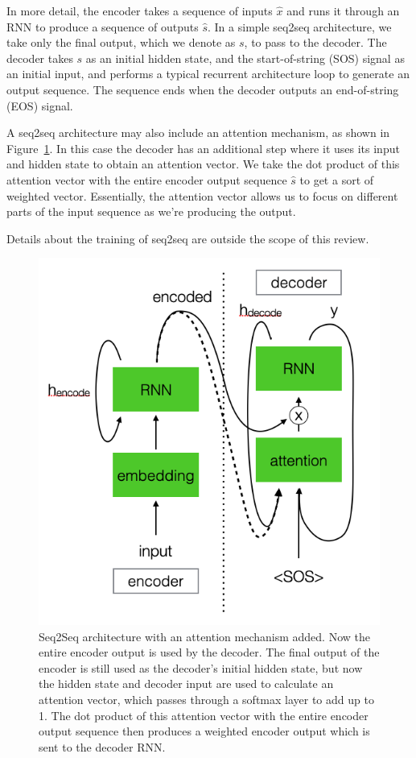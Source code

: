 In more detail, the encoder takes a sequence of inputs $\hat{x}$ and runs it through an RNN to produce a sequence of outputs $\hat{s}$. In a simple seq2seq architecture, we take only the final output, which we denote as $s$, to pass to the decoder. The decoder takes $s$ as an initial hidden state, and the start-of-string (SOS) signal as an initial input, and performs a typical recurrent architecture loop to generate an output sequence. The sequence ends when the decoder outputs an end-of-string (EOS) signal.

A seq2seq architecture may also include an attention mechanism, as shown in Figure~\ref{fig:seq2seq_with_attention}. In this case the decoder has an additional step where it uses its input and hidden state to obtain an attention vector. We take the dot product of this attention vector with the entire encoder output sequence $\hat{s}$ to get a sort of weighted vector. Essentially, the attention vector allows us to focus on different parts of the input sequence as we're producing the output.

Details about the training of seq2seq are outside the scope of this review.

\begin{figure}[htbp]
    \centering
    \includegraphics[width=0.55\linewidth]{Images/ML/seq2seq_with_attention.png}
    \caption{Seq2Seq architecture with an attention mechanism added. Now the entire encoder output is used by the decoder. The final output of the encoder is still used as the decoder's initial hidden state, but now the hidden state and decoder input are used to calculate an attention vector, which passes through a softmax layer to add up to 1. The dot product of this attention vector with the entire encoder output sequence then produces a weighted encoder output which is sent to the decoder RNN.}
    \label{fig:seq2seq_with_attention}
\end{figure}


